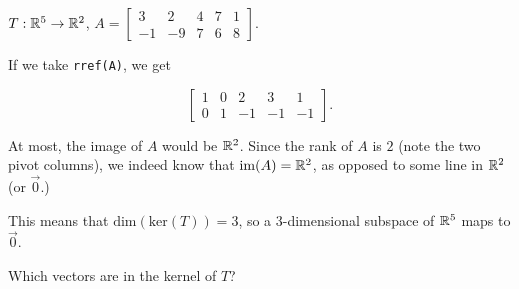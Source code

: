 \documentclass{ximera}
\begin{document}
\begin{problem}\label{prob:imagerankoflintrans1}
$T:\mathbb{R}^5\rightarrow \mathbb{R}^2$, $A=\begin{bmatrix}3&2&4&7&1\\-1&-9&7&6&8\end{bmatrix}$.
  
\begin{selectAll}
\end{selectAll}
  
\begin{solution}

  If we take \texttt{rref(A)}, we get

  $$\begin{bmatrix}1&0&2&3&1\\0&1&-1&-1&-1\end{bmatrix}.$$

  At most, the image of $A$ would be $\mathbb{R}^2$. Since the rank of $A$ is $2$ (note the two pivot columns), we indeed know that $\mbox{im}(A)=\mathbb{R}^2$, as opposed to some line in $\mathbb{R}^2$ (or $\vec{0}$.)

  This means that $\mbox{dim}(\mbox{ker}(T))=3$, so a $3$-dimensional subspace of $\mathbb{R}^5$ maps to $\vec{0}$.

\end{solution}

Which vectors are in the kernel of $T$?

\begin{selectAll}




\end{selectAll}
\end{problem}
\end{document}
